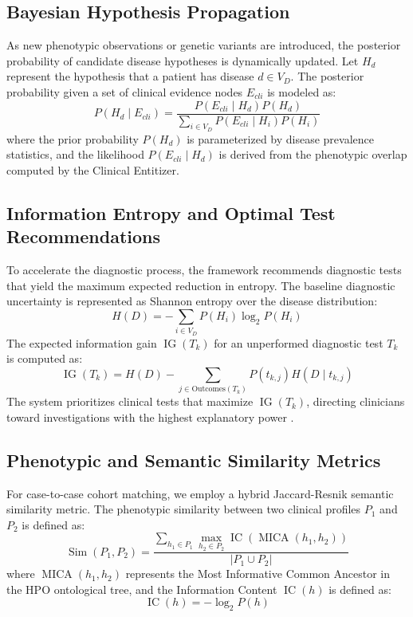 \documentclass[conference]{IEEEtran}
\begin{document}
\subsection{Bayesian Hypothesis Propagation}
As new phenotypic observations or genetic variants are introduced, the posterior probability of candidate disease hypotheses is dynamically updated. Let $H_d$ represent the hypothesis that a patient has disease $d \in V_D$. The posterior probability given a set of clinical evidence nodes $E_{cli}$ is modeled as:
\begin{equation}
P(H_d \mid E_{cli}) = \frac{P(E_{cli} \mid H_d) P(H_d)}{\sum_{i \in V_D} P(E_{cli} \mid H_i) P(H_i)}
\end{equation}
where the prior probability $P(H_d)$ is parameterized by disease prevalence statistics, and the likelihood $P(E_{cli} \mid H_d)$ is derived from the phenotypic overlap computed by the Clinical Entitizer.

\subsection{Information Entropy and Optimal Test Recommendations}
To accelerate the diagnostic process, the framework recommends diagnostic tests that yield the maximum expected reduction in entropy. The baseline diagnostic uncertainty is represented as Shannon entropy over the disease distribution:
\begin{equation}
H(D) = -\sum_{i \in V_D} P(H_i) \log_2 P(H_i)
\end{equation}
The expected information gain $\operatorname{IG}(T_k)$ for an unperformed diagnostic test $T_k$ is computed as:
\begin{equation}
\operatorname{IG}(T_k) = H(D) - \sum_{j \in \text{Outcomes}(T_k)} P(t_{k,j}) H(D \mid t_{k,j})
\end{equation}
The system prioritizes clinical tests that maximize $\operatorname{IG}(T_k)$, directing clinicians toward investigations with the highest explanatory power \cite{ref10}.

\subsection{Phenotypic and Semantic Similarity Metrics}
For case-to-case cohort matching, we employ a hybrid Jaccard-Resnik semantic similarity metric. The phenotypic similarity between two clinical profiles $P_1$ and $P_2$ is defined as:
\begin{equation}
\operatorname{Sim}(P_1, P_2) = \frac{\sum_{h_1 \in P_1} \max_{h_2 \in P_2} \operatorname{IC}(\operatorname{MICA}(h_1, h_2))}{\lvert P_1 \cup P_2 \rvert}
\end{equation}
where $\operatorname{MICA}(h_1, h_2)$ represents the Most Informative Common Ancestor in the HPO ontological tree, and the Information Content $\operatorname{IC}(h)$ is defined as:
\begin{equation}
\operatorname{IC}(h) = -\log_2 P(h)
\end{equation}
\end{document}
